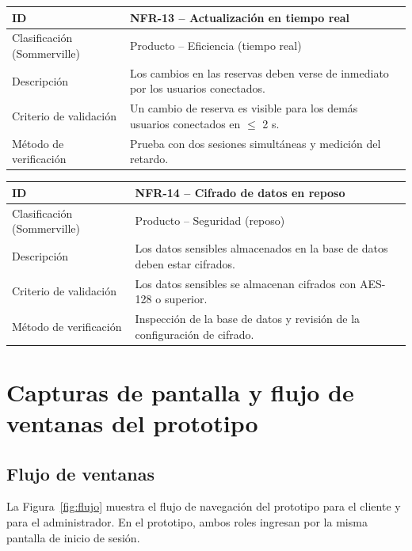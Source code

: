 \documentclass[12pt,a4paper]{article}
\newcommand{\nfr}[6]{%
  \noindent\begin{tabular}{|p{3.1cm}|p{11.9cm}|}
  \hline
  \rowcolor{gray!20}\textbf{ID} & \textbf{#1 -- #2} \\ \hline
  Clasificaci\'on (Sommerville) & #3 \\ \hline
  Descripci\'on & #4 \\ \hline
  Criterio de validaci\'on & #5 \\ \hline
  M\'etodo de verificaci\'on & #6 \\ \hline
  \end{tabular}\par\medskip}
\begin{document}
\nfr{NFR-13}{Actualizaci\'on en tiempo real}{Producto -- Eficiencia (tiempo real)}
{Los cambios en las reservas deben verse de inmediato por los usuarios conectados.}
{Un cambio de reserva es visible para los dem\'as usuarios conectados en $\leq$ 2 s.}
{Prueba con dos sesiones simult\'aneas y medici\'on del retardo.}

\nfr{NFR-14}{Cifrado de datos en reposo}{Producto -- Seguridad (reposo)}
{Los datos sensibles almacenados en la base de datos deben estar cifrados.}
{Los datos sensibles se almacenan cifrados con AES-128 o superior.}
{Inspecci\'on de la base de datos y revisi\'on de la configuraci\'on de cifrado.}

\newpage
\section{Capturas de pantalla y flujo de ventanas del prototipo}\label{app:prototipo}

\subsection*{Flujo de ventanas}
La Figura~\ref{fig:flujo} muestra el flujo de navegaci\'on del prototipo para el cliente y para el administrador. En el prototipo, ambos roles ingresan por la misma pantalla de inicio de sesi\'on.
\end{document}
